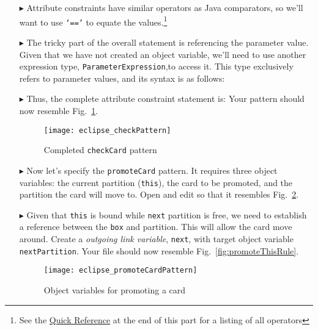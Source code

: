 \begin{itemize}
\item[$\blacktriangleright$] Attribute constraints have similar operators as Java comparators, so we'll want to use \texttt{`=='} to equate the
values.\footnote{See the \hyperlink{quickRef}{Quick Reference} at the end of this part for a listing of all operators}

\item[$\blacktriangleright$] The tricky part of the overall statement is referencing the parameter value. Given that we have not created an object variable,
we'll need to use another expression type, \texttt{ParameterExpression},to access it. This type exclusively refers to parameter
values, and its syntax is as follows:

\item[$\blacktriangleright$] Thus, the complete attribute constraint statement is:  Your pattern should now resemble
Fig.~\ref{fig:checkPattern}.

\vspace{0.5cm}

\begin{figure}[htbp]
\begin{center}
  \texttt{[image: eclipse\_checkPattern]}
  \caption{Completed \texttt{checkCard} pattern}
  \label{fig:checkPattern}
\end{center}
\end{figure} 

\item[$\blacktriangleright$] Now let's specify the \texttt{promoteCard} pattern. It requires three object variables: the current partition (\texttt{this}),
the card to be promoted, and the partition the card will move to. Open and edit so that it resembles Fig.~\ref{fig:promoteCardPattern}.

\item[$\blacktriangleright$] Given that \texttt{this} is bound while \texttt{next} partition is free, we need to establish a reference between the \texttt{box}
and partition. This will allow the card move around. Create a \emph{outgoing link variable}, \texttt{next},  with target object variable \texttt{nextPartition}.
Your file should now resemble Fig.~\ref{fig:promoteThisRule}.

\newpage

\begin{figure}[htbp]
\begin{center}
  \texttt{[image: eclipse\_promoteCardPattern]}
  \caption{Object variables for promoting a card}
  \label{fig:promoteCardPattern}
\end{center}
\end{figure} 


\end{itemize}
